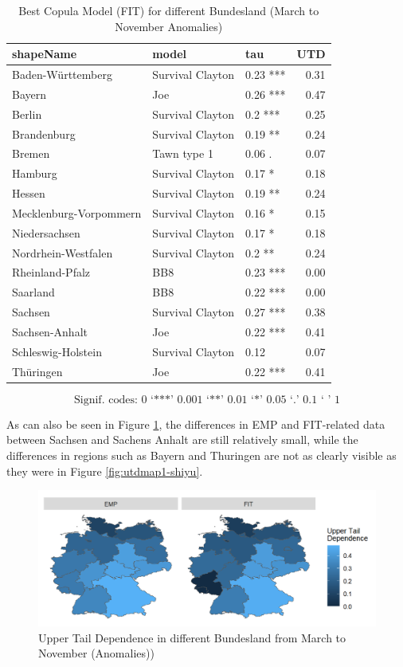 \documentclass[
]{krantz}
\begin{document}
\begin{table}

\caption{\label{tab:tab6-shiyu}Best Copula Model (FIT) for different Bundesland (March to November Anomalies)}
\centering
\begin{tabular}[t]{l|l|l|r}
\hline
shapeName & model & tau & UTD\\
\hline
Baden-Württemberg & Survival Clayton & 0.23 *** & 0.31\\
\hline
Bayern & Joe & 0.26 *** & 0.47\\
\hline
Berlin & Survival Clayton & 0.2 *** & 0.25\\
\hline
Brandenburg & Survival Clayton & 0.19 ** & 0.24\\
\hline
Bremen & Tawn type 1 & 0.06 . & 0.07\\
\hline
Hamburg & Survival Clayton & 0.17 * & 0.18\\
\hline
Hessen & Survival Clayton & 0.19 ** & 0.24\\
\hline
Mecklenburg-Vorpommern & Survival Clayton & 0.16 * & 0.15\\
\hline
Niedersachsen & Survival Clayton & 0.17 * & 0.18\\
\hline
Nordrhein-Westfalen & Survival Clayton & 0.2 ** & 0.24\\
\hline
Rheinland-Pfalz & BB8 & 0.23 *** & 0.00\\
\hline
Saarland & BB8 & 0.22 *** & 0.00\\
\hline
Sachsen & Survival Clayton & 0.27 *** & 0.38\\
\hline
Sachsen-Anhalt & Joe & 0.22 *** & 0.41\\
\hline
Schleswig-Holstein & Survival Clayton & 0.12 & 0.07\\
\hline
Thüringen & Joe & 0.22 *** & 0.41\\
\hline
\end{tabular}
\end{table}

\[\text{Signif. codes: 0 ‘***’ 0.001 ‘**’ 0.01 ‘*’ 0.05 ‘.’ 0.1 ‘ ’ 1}\]

As can also be seen in Figure \ref{fig:utdmap2-shiyu}, the differences in EMP and FIT-related data between Sachsen and Sachens Anhalt are still relatively small, while the differences in regions such as Bayern and Thuringen are not as clearly visible as they were in Figure \ref{fig:utdmap1-shiyu}.

\begin{figure}

{\centering \includegraphics[width=0.8\linewidth]{work/03-compounds/figures/UTDMAP/anomalies} 

}

\caption{Upper Tail Dependence in different Bundesland from March to November (Anomalies))}\label{fig:utdmap2-shiyu}
\end{figure}
\end{document}
